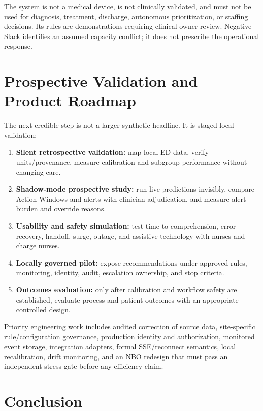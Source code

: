 \documentclass[11pt,a4paper]{article}
\begin{document}
The system is not a medical device, is not clinically validated, and must not be used for diagnosis, treatment, discharge, autonomous prioritization, or staffing decisions. Its rules are demonstrations requiring clinical-owner review. Negative Slack identifies an assumed capacity conflict; it does not prescribe the operational response.

\section{Prospective Validation and Product Roadmap}

The next credible step is not a larger synthetic headline. It is staged local validation:

\begin{enumerate}
  \item \textbf{Silent retrospective validation:} map local ED data, verify units/provenance, measure calibration and subgroup performance without changing care.
  \item \textbf{Shadow-mode prospective study:} run live predictions invisibly, compare Action Windows and alerts with clinician adjudication, and measure alert burden and override reasons.
  \item \textbf{Usability and safety simulation:} test time-to-comprehension, error recovery, handoff, surge, outage, and assistive technology with nurses and charge nurses.
  \item \textbf{Locally governed pilot:} expose recommendations under approved rules, monitoring, identity, audit, escalation ownership, and stop criteria.
  \item \textbf{Outcomes evaluation:} only after calibration and workflow safety are established, evaluate process and patient outcomes with an appropriate controlled design.
\end{enumerate}

Priority engineering work includes audited correction of source data, site-specific rule/configuration governance, production identity and authorization, monitored event storage, integration adapters, formal SSE/reconnect semantics, local recalibration, drift monitoring, and an NBO redesign that must pass an independent stress gate before any efficiency claim.

\section{Conclusion}
\end{document}
